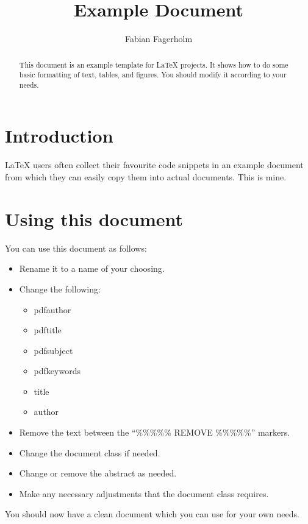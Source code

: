 \documentclass{article}
\begin{document}
\title{Example Document}
\author{Fabian Fagerholm}

\maketitle

\begin{abstract}
This document is an example template for \LaTeX{} projects. It shows how to do some basic formatting of text, tables, and figures. You should modify it according to your needs.
\end{abstract}


\section{Introduction}
\label{sec:introduction}

\LaTeX{} users often collect their favourite code snippets in an example document from which they can easily copy them into actual documents. This is mine.

\section{Using this document}

You can use this document as follows:
\begin{itemize}
    \item Rename it to a name of your choosing.
    \item Change the following:
    \begin{itemize}
        \item pdfauthor
        \item pdftitle
        \item pdfsubject
        \item pdfkeywords
        \item title
        \item author
    \end{itemize}
    \item Remove the text between the ``\%\%\%\%\% REMOVE \%\%\%\%\%'' markers.
    \item Change the document class if needed.
    \item Change or remove the abstract as needed.
    \item Make any necessary adjustments that the document class requires.
\end{itemize}
You should now have a clean document which you can use for your own needs.
\end{document}
